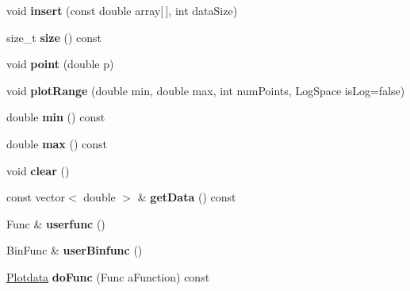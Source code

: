 \begin{DoxyCompactItemize}
\item 
void {\bfseries insert} (const double array\mbox{[}$\,$\mbox{]}, int data\+Size)\hypertarget{class_plotdata_acd50b6577cc9a8a77f05a69e6c256839}{}\label{class_plotdata_acd50b6577cc9a8a77f05a69e6c256839}

\item 
size\+\_\+t {\bfseries size} () const \hypertarget{class_plotdata_aac782da1f912bceb5d8ad00c8dc892ac}{}\label{class_plotdata_aac782da1f912bceb5d8ad00c8dc892ac}

\item 
void {\bfseries point} (double p)\hypertarget{class_plotdata_a07d1837244d50d7feaa343641f7869b7}{}\label{class_plotdata_a07d1837244d50d7feaa343641f7869b7}

\item 
void {\bfseries plot\+Range} (double min, double max, int num\+Points, Log\+Space is\+Log=false)\hypertarget{class_plotdata_a158a407e71fa78dbe57e5d3f19173682}{}\label{class_plotdata_a158a407e71fa78dbe57e5d3f19173682}

\item 
double {\bfseries min} () const \hypertarget{class_plotdata_a2316dcf397d4aaefbe79179748f2a007}{}\label{class_plotdata_a2316dcf397d4aaefbe79179748f2a007}

\item 
double {\bfseries max} () const \hypertarget{class_plotdata_a9bfc3700bf01576b1ca49e5a64b87abe}{}\label{class_plotdata_a9bfc3700bf01576b1ca49e5a64b87abe}

\item 
void {\bfseries clear} ()\hypertarget{class_plotdata_ac8bb3912a3ce86b15842e79d0b421204}{}\label{class_plotdata_ac8bb3912a3ce86b15842e79d0b421204}

\item 
const vector$<$ double $>$ \& {\bfseries get\+Data} () const \hypertarget{class_plotdata_aae7edb18b7df1b9abe926c8fbf54d088}{}\label{class_plotdata_aae7edb18b7df1b9abe926c8fbf54d088}

\item 
Func \& {\bfseries userfunc} ()\hypertarget{class_plotdata_ad11646fab1335430344112e4e528f9e9}{}\label{class_plotdata_ad11646fab1335430344112e4e528f9e9}

\item 
Bin\+Func \& {\bfseries user\+Binfunc} ()\hypertarget{class_plotdata_a7ccacef74851c882ab55f4f904e4ec84}{}\label{class_plotdata_a7ccacef74851c882ab55f4f904e4ec84}

\item 
\hyperlink{class_plotdata}{Plotdata} {\bfseries do\+Func} (Func a\+Function) const \hypertarget{class_plotdata_ab0f850bd7d1bee6aeceee9c68b798208}{}\label{class_plotdata_ab0f850bd7d1bee6aeceee9c68b798208}


\end{DoxyCompactItemize}
